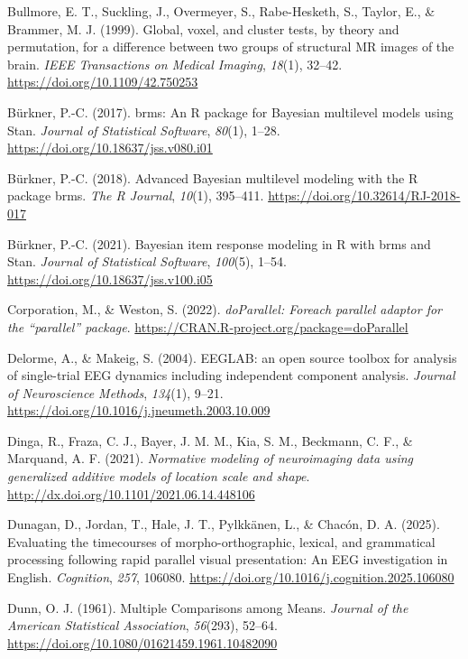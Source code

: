 \documentclass[
  doc,
  floatsintext,
  longtable,
  a4paper,
  nolmodern,
  notxfonts,
  notimes,
  colorlinks=true,linkcolor=blue,citecolor=blue,urlcolor=blue]{apa7}
\newlength{\cslhangindent}
\newenvironment{CSLReferences}[2] %
 {\begin{list}{}{%
  \setlength{\itemindent}{0pt}
  \setlength{\leftmargin}{0pt}
  \setlength{\parsep}{0pt}
  \ifodd #1
   \setlength{\leftmargin}{\cslhangindent}
   \setlength{\itemindent}{-1\cslhangindent}
  \fi
  \setlength{\itemsep}{#2\baselineskip}}}
 {\end{list}}
\begin{document}
\begin{CSLReferences}{1}{0}
Bullmore, E. T., Suckling, J., Overmeyer, S., Rabe-Hesketh, S., Taylor,
E., \& Brammer, M. J. (1999). Global, voxel, and cluster tests, by
theory and permutation, for a difference between two groups of
structural MR images of the brain. \emph{IEEE Transactions on Medical
Imaging}, \emph{18}(1), 32--42. \url{https://doi.org/10.1109/42.750253}

Bürkner, P.-C. (2017). {brms}: An {R} package for {Bayesian} multilevel
models using {Stan}. \emph{Journal of Statistical Software},
\emph{80}(1), 1--28. \url{https://doi.org/10.18637/jss.v080.i01}

Bürkner, P.-C. (2018). Advanced {Bayesian} multilevel modeling with the
{R} package {brms}. \emph{The R Journal}, \emph{10}(1), 395--411.
\url{https://doi.org/10.32614/RJ-2018-017}

Bürkner, P.-C. (2021). Bayesian item response modeling in {R} with
{brms} and {Stan}. \emph{Journal of Statistical Software},
\emph{100}(5), 1--54. \url{https://doi.org/10.18637/jss.v100.i05}

Corporation, M., \& Weston, S. (2022). \emph{{doParallel}: Foreach
parallel adaptor for the {``{parallel}''} package}.
\url{https://CRAN.R-project.org/package=doParallel}

Delorme, A., \& Makeig, S. (2004). EEGLAB: an open source toolbox for
analysis of single-trial EEG dynamics including independent component
analysis. \emph{Journal of Neuroscience Methods}, \emph{134}(1), 9--21.
\url{https://doi.org/10.1016/j.jneumeth.2003.10.009}

Dinga, R., Fraza, C. J., Bayer, J. M. M., Kia, S. M., Beckmann, C. F.,
\& Marquand, A. F. (2021). \emph{Normative modeling of neuroimaging data
using generalized additive models of location scale and shape}.
\url{http://dx.doi.org/10.1101/2021.06.14.448106}

Dunagan, D., Jordan, T., Hale, J. T., Pylkkänen, L., \& Chacón, D. A.
(2025). Evaluating the timecourses of morpho-orthographic, lexical, and
grammatical processing following rapid parallel visual presentation: An
EEG investigation in English. \emph{Cognition}, \emph{257}, 106080.
\url{https://doi.org/10.1016/j.cognition.2025.106080}

Dunn, O. J. (1961). Multiple Comparisons among Means. \emph{Journal of
the American Statistical Association}, \emph{56}(293), 52--64.
\url{https://doi.org/10.1080/01621459.1961.10482090}


\end{CSLReferences}
\end{document}
